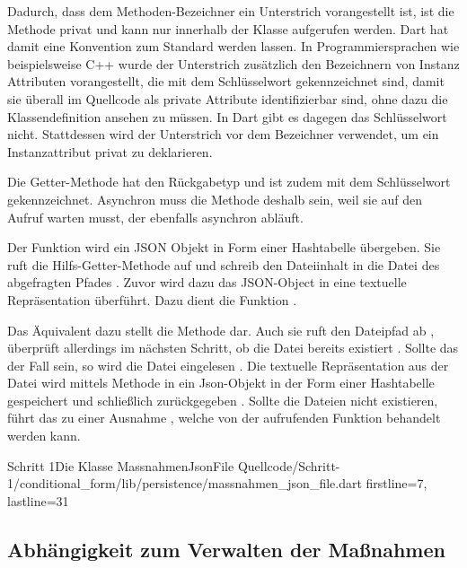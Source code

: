 Dadurch, dass dem Methoden-Bezeichner  ein Unterstrich vorangestellt ist, ist die Methode privat und kann nur innerhalb der Klasse aufgerufen werden. Dart hat damit eine Konvention zum Standard werden lassen. In Programmiersprachen wie beispielsweise C++ wurde der Unterstrich zusätzlich den Bezeichnern von Instanz Attributen vorangestellt, die mit dem  Schlüsselwort gekennzeichnet sind, damit sie überall im Quellcode als private Attribute identifizierbar sind, ohne dazu die Klassendefinition ansehen zu müssen. In Dart gibt es dagegen das  Schlüsselwort nicht. Stattdessen wird der Unterstrich vor dem Bezeichner verwendet, um ein Instanzattribut privat zu deklarieren.

Die Getter-Methode  hat den Rückgabetyp  und ist zudem mit dem Schlüsselwort  gekennzeichnet. Asynchron muss die Methode deshalb sein, weil sie auf den Aufruf  warten musst, der ebenfalls asynchron abläuft.

Der Funktion   wird ein JSON Objekt in Form einer Hashtabelle übergeben. Sie ruft die Hilfs-Getter-Methode   auf und schreib den Dateiinhalt in die Datei des abgefragten Pfades . Zuvor wird dazu das JSON-Object in eine textuelle Repräsentation überführt. Dazu dient die Funktion .

Das Äquivalent dazu stellt die Methode   dar. Auch sie ruft den Dateipfad ab , überprüft allerdings im nächsten Schritt, ob die Datei bereits existiert . Sollte das der Fall sein, so wird die Datei eingelesen . Die textuelle Repräsentation aus der Datei wird mittels Methode  in ein Json-Objekt in der Form einer Hashtabelle gespeichert  und schließlich zurückgegeben . Sollte die Dateien nicht existieren, führt das zu einer Ausnahme , welche von der aufrufenden Funktion behandelt werden kann.

\begin{alexlisting}{Schritt 1}{Die Klasse MassnahmenJsonFile}
  {Quellcode/Schritt-1/conditional_form/lib/persistence/massnahmen_json_file.dart}
  {firstline=7, lastline=31}
  \label{lst:Schritt1KlasseMassnahmenJsonFile}
\end{alexlisting}

\clearpage
\subsection{ Abhängigkeit zum Verwalten der Maßnahmen}

